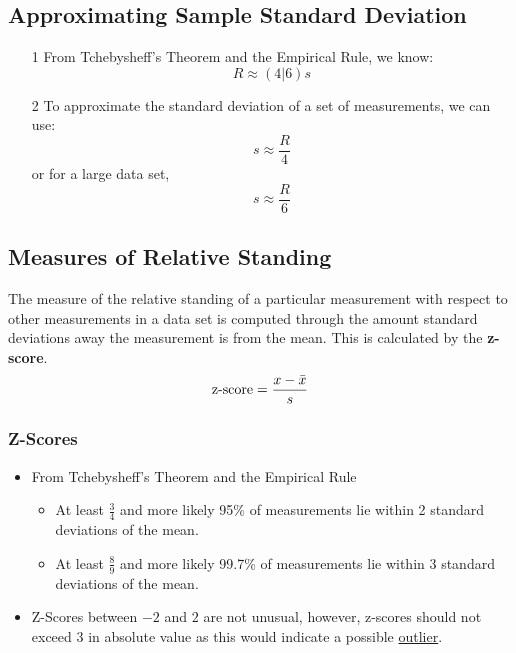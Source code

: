 \documentclass[12pt, letterpaper]{article}
\begin{document}
        \subsection{Approximating Sample Standard Deviation}
            \begin{itemize}
                \item[1] From Tchebysheff's Theorem and the Empirical Rule, we know: $$R \approx (4|6) s$$ 
                \item[2] To approximate the standard deviation of a set of measurements, we can use: $$s \approx \frac{R}{4}$$ or for a large data set, $$s \approx \frac{R}{6}$$ 
            \end{itemize}
        
        \subsection{Measures of Relative Standing}
            The measure of the relative standing of a particular measurement with respect to other measurements in a data set is computed through the amount standard deviations away the measurement is from the mean. This is calculated by the \textbf{z-score}.
            \begin{equation}
                \textnormal{z-score} = \frac{x - \bar{x}}{s}
            \end{equation}
            \subsubsection{Z-Scores}
                \begin{itemize}
                    \item From Tchebysheff's Theorem and the Empirical Rule
                        \begin{itemize}
                            \item At least $\frac{3}{4}$ and more likely 95\% of measurements lie within 2 standard deviations of the mean.
                            \item At least $\frac{8}{9}$ and more likely 99.7\% of measurements lie within 3 standard deviations of the mean. 
                        \end{itemize}
                    \item Z-Scores between $-2$ and $2$ are not unusual, however, z-scores should not exceed 3 in absolute value as this would indicate a possible \underline{outlier}.
                \end{itemize}
\end{document}
